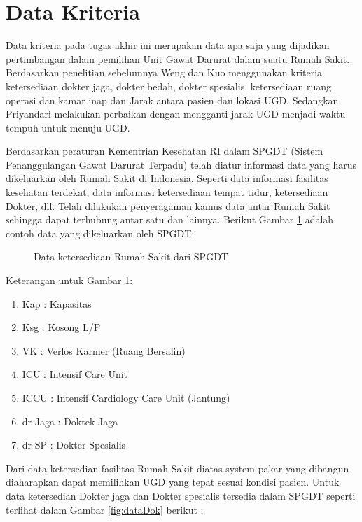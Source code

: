 \section{Data Kriteria}
Data kriteria pada tugas akhir ini merupakan data apa saja yang dijadikan pertimbangan dalam pemilihan Unit Gawat Darurat dalam suatu Rumah Sakit. Berdasarkan penelitian sebelumnya Weng dan Kuo \cite{weng2009} menggunakan kriteria ketersediaan dokter jaga, dokter bedah, dokter spesialis, ketersediaan ruang operasi dan kamar inap dan Jarak antara pasien dan lokasi UGD. Sedangkan Priyandari \cite{priyandari2011} melakukan perbaikan dengan mengganti jarak UGD menjadi waktu tempuh untuk menuju UGD. \par
Berdasarkan peraturan Kementrian Kesehatan RI \cite{kemenkes} dalam SPGDT (Sistem Penanggulangan Gawat Darurat Terpadu) telah diatur informasi data yang harus dikeluarkan oleh Rumah Sakit di Indonesia. Seperti data informasi fasilitas kesehatan terdekat, data informasi ketersediaan tempat tidur, ketersediaan Dokter, dll. Telah dilakukan penyeragaman kamus data antar Rumah Sakit sehingga dapat terhubung antar satu dan lainnya. Berikut Gambar \ref{fig:dataRS} adalah contoh data yang dikeluarkan oleh SPGDT:
\begin{figure}[h]	
	{\centering {}\par}
	\caption{Data ketersediaan Rumah Sakit dari SPGDT}
	\label{fig:dataRS}
\end{figure}
\par
Keterangan untuk Gambar \ref{fig:dataRS}:
\begin{enumerate}
	\item Kap 	: Kapasitas 
	\item Ksg	: Kosong L/P
	\item VK		: Verlos Karmer (Ruang Bersalin)
	\item ICU	:  Intensif Care Unit
	\item ICCU	:  Intensif Cardiology Care Unit (Jantung)
	\item dr Jaga	: Doktek Jaga
	\item dr SP	: Dokter Spesialis
\end{enumerate}
\par
Dari data ketersedian fasilitas Rumah Sakit diatas system pakar yang dibangun diaharapkan dapat memilihkan UGD yang tepat sesuai kondisi pasien. Untuk data ketersedian Dokter jaga dan Dokter spesialis tersedia dalam SPGDT seperti terlihat dalam Gambar \ref{fig:dataDok} berikut :

